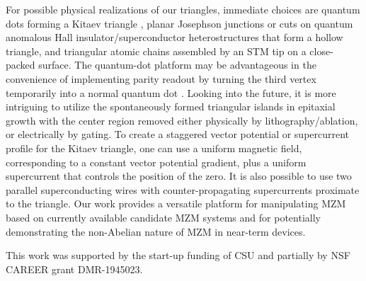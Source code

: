 \documentclass[aps,prb,twocolumn,showpacs,amsmath,amssymb,superscriptaddress]{revtex4-2}
\begin{document}
For possible physical realizations of our triangles, immediate choices are quantum dots forming a Kitaev triangle \cite{dvirRealizationMinimalKitaev2023}, planar Josephson junctions or cuts on quantum anomalous Hall insulator/superconductor heterostructures \cite{xieCreatingLocalizedMajorana2021} that form a hollow triangle, and triangular atomic chains assembled by an STM tip \cite{schneiderPrecursorsMajoranaModes2022} on a close-packed surface. The quantum-dot platform may be advantageous in the convenience of implementing parity readout by turning the third vertex temporarily into a normal quantum dot \cite{mishmashDephasingLeakageDynamics2020,parity_QD_readout_2020, fengProbingRobustMajorana2022}. Looking into the future, it is more intriguing to utilize the spontaneously formed triangular islands in epitaxial growth \cite{pietzschSpinResolvedElectronicStructure2006} with the center region removed either physically by lithography/ablation, or electrically by gating. To create a staggered vector potential or supercurrent profile for the Kitaev triangle, one can use a uniform magnetic field, corresponding to a constant vector potential gradient, plus a uniform supercurrent that controls the position of the zero. It is also possible to use two parallel superconducting wires with counter-propagating supercurrents proximate to the triangle. Our work provides a versatile platform for manipulating MZM based on currently available candidate MZM systems and for potentially demonstrating the non-Abelian nature of MZM in near-term devices.

\begin{acknowledgements}
This work was supported by the start-up funding of CSU and partially by NSF CAREER grant DMR-1945023.
\end{acknowledgements}



%
\end{document}
